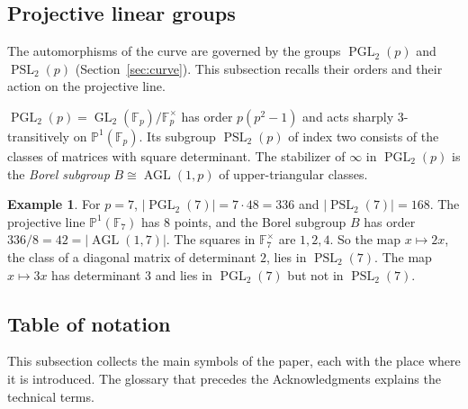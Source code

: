 \documentclass[12pt,letterpaper]{article}
\theoremstyle{definition}
\newtheorem{example}[theorem]{Example}
\theoremstyle{remark}
\numberwithin{equation}{section}
\newcommand{\F}{\mathbb{F}}
\newcommand{\PP}{\mathbb{P}}
\newcommand{\AGL}{\operatorname{AGL}}
\newcommand{\GL}{\operatorname{GL}}
\newcommand{\PSL}{\operatorname{PSL}}
\newcommand{\PGL}{\operatorname{PGL}}
\begin{document}
\subsection{Projective linear groups}\label{subsec:bg-pgl}
The automorphisms of the curve are governed by the groups $\PGL_2(p)$ and
$\PSL_2(p)$ (Section~\ref{sec:curve}). This subsection recalls their
orders and their action on the projective line.

$\PGL_2(p)=\GL_2(\F_p)/\F_p^\times$ has order $p(p^2-1)$ and acts sharply
$3$-transitively on $\PP^1(\F_p)$.  Its subgroup $\PSL_2(p)$ of index two
consists of the classes of matrices with square determinant.  The
stabilizer of $\infty$ in $\PGL_2(p)$ is the \emph{Borel subgroup}
$B\cong\AGL(1,p)$ of upper-triangular classes.

\begin{example}\label{ex:bg-pgl}
For $p=7$, $|\PGL_2(7)|=7\cdot48=336$ and $|\PSL_2(7)|=168$. The
projective line $\PP^1(\F_7)$ has $8$ points, and the Borel subgroup $B$
has order $336/8=42=|\AGL(1,7)|$. The squares in $\F_7^\times$ are
$1,2,4$. So the map $x\mapsto2x$, the class of a diagonal matrix of
determinant $2$, lies in $\PSL_2(7)$. The map $x\mapsto3x$ has
determinant $3$ and lies in $\PGL_2(7)$ but not in $\PSL_2(7)$.
\end{example}

\subsection{Table of notation}\label{subsec:notation}
This subsection collects the main symbols of the paper, each with the
place where it is introduced. The glossary that precedes the
Acknowledgments explains the technical terms.
\end{document}
